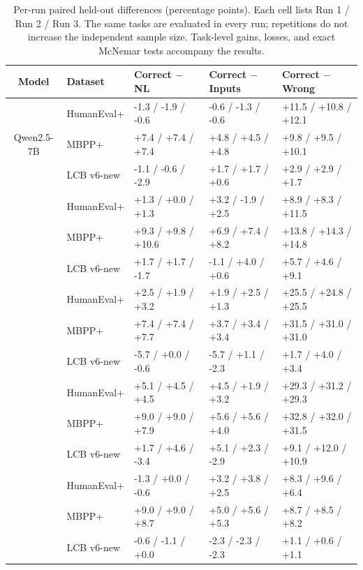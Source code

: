 \begin{table}[!htbp]
\centering
\caption{Per-run paired held-out differences (percentage points). Each cell lists Run 1 / Run 2 / Run 3. The same tasks are evaluated in every run; repetitions do not increase the independent sample size. Task-level gains, losses, and exact McNemar tests accompany the results.}
\label{tab:repeats}
\small
\begin{tabular}{cllll}
\toprule
Model & Dataset & Correct $-$ NL & Correct $-$ Inputs & Correct $-$ Wrong \\
\midrule
\multirow{3}{*}{Qwen2.5-7B} & HumanEval+ & -1.3 / -1.9 / -0.6 & -0.6 / -1.3 / -0.6 & +11.5 / +10.8 / +12.1 \\
& MBPP+ & +7.4 / +7.4 / +7.4 & +4.8 / +4.5 / +4.8 & +9.8 / +9.5 / +10.1 \\
& LCB v6-new & -1.1 / -0.6 / -2.9 & +1.7 / +1.7 / +0.6 & +2.9 / +2.9 / +1.7 \\
\addlinespace[2pt]
\multirow{3}{*}{Qwen3.5-9B} & HumanEval+ & +1.3 / +0.0 / +1.3 & +3.2 / -1.9 / +2.5 & +8.9 / +8.3 / +11.5 \\
& MBPP+ & +9.3 / +9.8 / +10.6 & +6.9 / +7.4 / +8.2 & +13.8 / +14.3 / +14.8 \\
& LCB v6-new & +1.7 / +1.7 / -1.7 & -1.1 / +4.0 / +0.6 & +5.7 / +4.6 / +9.1 \\
\addlinespace[2pt]
\multirow{3}{*}{Qwen3.6-27B} & HumanEval+ & +2.5 / +1.9 / +3.2 & +1.9 / +2.5 / +1.3 & +25.5 / +24.8 / +25.5 \\
& MBPP+ & +7.4 / +7.4 / +7.7 & +3.7 / +3.4 / +3.4 & +31.5 / +31.0 / +31.0 \\
& LCB v6-new & -5.7 / +0.0 / -0.6 & -5.7 / +1.1 / -2.3 & +1.7 / +4.0 / +3.4 \\
\addlinespace[2pt]
\multirow{3}{*}{Qwen3.8-27B} & HumanEval+ & +5.1 / +4.5 / +4.5 & +4.5 / +1.9 / +3.2 & +29.3 / +31.2 / +29.3 \\
& MBPP+ & +9.0 / +9.0 / +7.9 & +5.6 / +5.6 / +4.0 & +32.8 / +32.0 / +31.5 \\
& LCB v6-new & +1.7 / +4.6 / -3.4 & +5.1 / +2.3 / -2.9 & +9.1 / +12.0 / +10.9 \\
\addlinespace[2pt]
\multirow{3}{*}{DeepSeek-6.7B} & HumanEval+ & -1.3 / +0.0 / -0.6 & +3.2 / +3.8 / +2.5 & +8.3 / +9.6 / +6.4 \\
& MBPP+ & +9.0 / +9.0 / +8.7 & +5.0 / +5.6 / +5.3 & +8.7 / +8.5 / +8.2 \\
& LCB v6-new & -0.6 / -1.1 / +0.0 & -2.3 / -2.3 / -2.3 & +1.1 / +0.6 / +1.1 \\
\bottomrule
\end{tabular}
\end{table}
